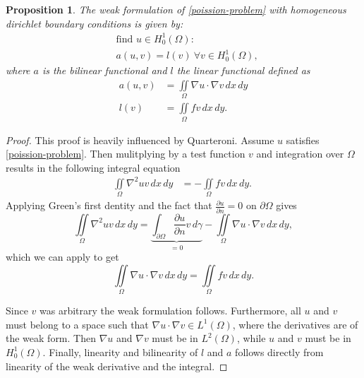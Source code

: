 \documentclass[11pt,a4paper,english]{elsarticle}%
\newtheorem{proposition}[theorem]{Proposition}
\begin{document}
\begin{proposition}
    The weak formulation of \eqref{poission-problem} with homogeneous dirichlet boundary conditions is given by:  
    \begin{equation*}
        \begin{aligned}
        &\text{find } u \in H_0^{1}(\Omega) : 
        \\
        &a(u,v) = l(v) \ \forall v \in H_0^{1}(\Omega), 
        \end{aligned}
    \end{equation*}
    where $a$ is the bilinear functional and $l$ the linear functional defined as 
    \begin{equation*}
        \begin{aligned}
            a(u,v) &= \iint\limits_{\Omega} \nabla u \cdot \nabla v \, dx \, dy
            \\
            l(v) &= \iint\limits_{\Omega} fv \, dx \, dy.
        \end{aligned}
    \end{equation*}
\end{proposition}
\begin{proof}
    This proof is heavily influenced by Quarteroni\cite[p. 44-45]{AQuart}.
    Assume $u$ satisfies \eqref{poission-problem}. Then mulitplying by a test function $v$ and integration over $\Omega$ results in the following integral equation
    \begin{equation}
        \label{weak-start}
        \begin{aligned}
            \iint\limits_{\Omega} \nabla^2uv \, dx \, dy &=  -\iint\limits_{\Omega} fv \, dx \, dy.\ 
        \end{aligned}
    \end{equation}
    Applying Green's first dentity and the fact that $\frac{\partial u}{\partial n} = 0$ on $\partial \Omega$ gives
    \begin{equation}
        \iint\limits_{\Omega} \nabla^2 u v \, dx \, dy 
        = \underbrace{\int_{\partial \Omega} \frac{\partial u}{\partial n} v \, d\gamma}_{=0} - \iint\limits_{\Omega} \nabla u \cdot \nabla v  \, dx \, dy,
        \label{greens-identety}
    \end{equation}
    which we can apply to get 
    \begin{equation}
        \iint\limits_{\Omega} \nabla u \cdot \nabla v \, dx \, dy = 
        \iint\limits_{\Omega} fv \, dx \, dy.
    \end{equation}
    
    Since $v$ was arbitrary the weak formulation follows. Furthermore, all $u$ and $v$ must belong to a space such that $\nabla u \cdot \nabla v \in {L^1}(\Omega)$, where the derivatives are of the weak form. Then $\nabla u$ and $\nabla v$ must be in ${L^2}(\Omega)$, while $u$ and $v$ must be in ${H^1_0}(\Omega)$. Finally, linearity and bilinearity of $l$ and $a$ follows directly from linearity of the weak derivative and the integral.
\end{proof}
\end{document}
